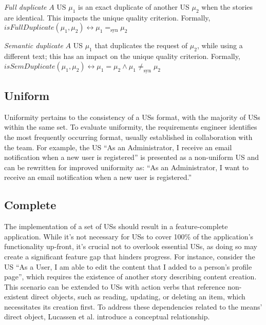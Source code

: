 \begin{definition}
\emph{Full duplicate} $A$ US $\mu_1$ is an exact duplicate of another US  $\mu_2$ when the stories are identical. This impacts the unique quality criterion. Formally,\\ 
$isFullDuplicate(\mu_1,\mu_2) \leftrightarrow \mu_1 =_{\text{syn}} \mu_2$
\end{definition}
\begin{definition}
\emph{Semantic duplicate} $A$ US $\mu_1$ that duplicates the request of $\mu_2$, while using a different text; this has an impact on the unique quality criterion. Formally,\\ 
$isSemDuplicate(\mu_1,\mu_2) \leftrightarrow \mu_1 = \mu_2 \wedge \mu_1 \neq _{\text{syn}} \mu_2$
\end{definition}
\subsection*{\normalsize{Uniform}}
Uniformity pertains to the consistency of a USs format, with the majority of USs within the same set. To evaluate uniformity, the requirements engineer identifies the most frequently occurring format, usually established in collaboration with the team. For example, the US \enquote{As an Administrator, I receive an email notification when a new user is registered} is presented as a non-uniform US and can be rewritten for improved uniformity as: \enquote{As an Administrator, I want to receive an email notification when a new user is registered.}
\subsection*{\normalsize{Complete}}
The implementation of a set of USs should result in a feature-complete application. While it's not necessary for USs to cover 100\% of the application's functionality up-front, it's crucial not to overlook essential USs, as doing so may create a significant feature gap that hinders progress. For instance, consider the US \enquote{As a User, I am able to edit the content that I added to a person’s profile page}, which requires the existence of another story describing content creation. This scenario can be extended to USs with action verbs that reference non-existent direct objects, such as reading, updating, or deleting an item, which necessitates its creation first. To address these dependencies related to the means' direct object, Lucassen et al. introduce a conceptual relationship. 
 
